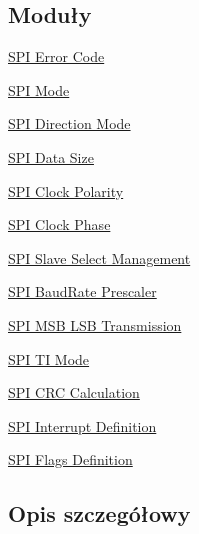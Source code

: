 \subsection*{Moduły}
\begin{DoxyCompactItemize}
\item 
\hyperlink{group___s_p_i___error___code}{S\+P\+I Error Code}
\item 
\hyperlink{group___s_p_i___mode}{S\+P\+I Mode}
\item 
\hyperlink{group___s_p_i___direction}{S\+P\+I Direction Mode}
\item 
\hyperlink{group___s_p_i___data___size}{S\+P\+I Data Size}
\item 
\hyperlink{group___s_p_i___clock___polarity}{S\+P\+I Clock Polarity}
\item 
\hyperlink{group___s_p_i___clock___phase}{S\+P\+I Clock Phase}
\item 
\hyperlink{group___s_p_i___slave___select__management}{S\+P\+I Slave Select Management}
\item 
\hyperlink{group___s_p_i___baud_rate___prescaler}{S\+P\+I Baud\+Rate Prescaler}
\item 
\hyperlink{group___s_p_i___m_s_b___l_s_b__transmission}{S\+P\+I M\+S\+B L\+S\+B Transmission}
\item 
\hyperlink{group___s_p_i___t_i__mode}{S\+P\+I T\+I Mode}
\item 
\hyperlink{group___s_p_i___c_r_c___calculation}{S\+P\+I C\+R\+C Calculation}
\item 
\hyperlink{group___s_p_i___interrupt__definition}{S\+P\+I Interrupt Definition}
\item 
\hyperlink{group___s_p_i___flags__definition}{S\+P\+I Flags Definition}
\end{DoxyCompactItemize}


\subsection{Opis szczegółowy}
